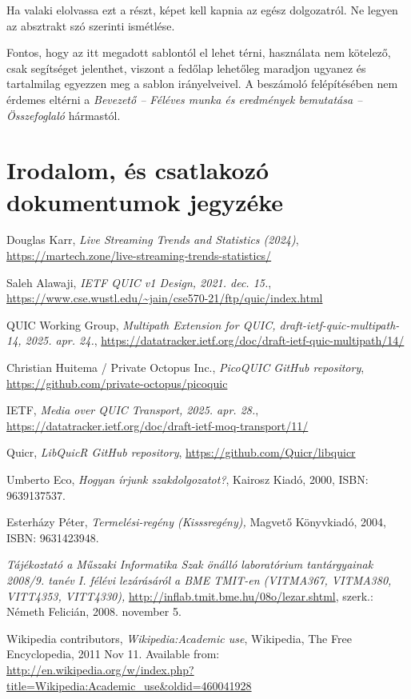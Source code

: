 \documentclass[a4paper,oneside]{article}
\begin{document}
Ha valaki elolvassa ezt a részt, képet kell kapnia az egész
dolgozatról.  Ne legyen az absztrakt szó szerinti ismétlése.

Fontos, hogy az itt megadott sablontól el lehet térni, használata nem
kötelező, csak segítséget jelenthet, viszont a fedőlap lehetőleg
maradjon ugyanez és tartalmilag egyezzen meg a sablon irányelveivel. A
beszámoló felépítésében nem érdemes eltérni a \emph{Bevezető --
  Féléves munka és eredmények bemutatása -- Összefoglaló} hármastól.

\newpage
 
\section{Irodalom, és csatlakozó dokumentumok jegyzéke}
\label{sec:irod-es-csatl}

\begin{thebibliography}{9}
\label{sec:tanulm-irod-jegyz}

 Douglas Karr, \emph{Live Streaming Trends and Statistics (2024)}, 
\url{https://martech.zone/live-streaming-trends-statistics/}

 Saleh Alawaji, \emph{IETF QUIC v1 Design, 2021. dec. 15.}, 
\url{https://www.cse.wustl.edu/~jain/cse570-21/ftp/quic/index.html}

 QUIC Working Group, \emph{Multipath Extension for QUIC, draft-ietf-quic-multipath-14, 2025. apr. 24.}, \url{https://datatracker.ietf.org/doc/draft-ietf-quic-multipath/14/}

 Christian Huitema / Private Octopus Inc., \emph{PicoQUIC GitHub repository}, \url{https://github.com/private-octopus/picoquic}

 IETF, \emph{Media over QUIC Transport, 2025. apr. 28.}, \url{https://datatracker.ietf.org/doc/draft-ietf-moq-transport/11/}

 Quicr, \emph{LibQuicR GitHub repository}, \url{https://github.com/Quicr/libquicr}


 Umberto Eco, \emph{Hogyan írjunk szakdolgozatot?},
  Kairosz Kiadó, 2000, ISBN: 9639137537.

 Esterházy Péter, \emph{Termelési-regény (Kisssregény),}
  Magvető Könyvkiadó, 2004, ISBN: 9631423948.

 \emph{Tájékoztató a Műszaki Informatika Szak önálló
    laboratórium tantárgyainak 2008/9. tanév I. félévi lezárásáról a
    BME TMIT-en (VITMA367, VITMA380, VITT4353, VITT4330),}
  \url{http://inflab.tmit.bme.hu/08o/lezar.shtml}, szerk.: Németh Felicián,
  2008. november 5.

 Wikipedia contributors, \emph{Wikipedia:Academic
    use}, Wikipedia, The Free Encyclopedia, 2011 Nov 11.  Available
  from: \\ \url{http://en.wikipedia.org/w/index.php?title=Wikipedia:Academic\_use\&oldid=460041928}

\end{thebibliography}
\end{document}
